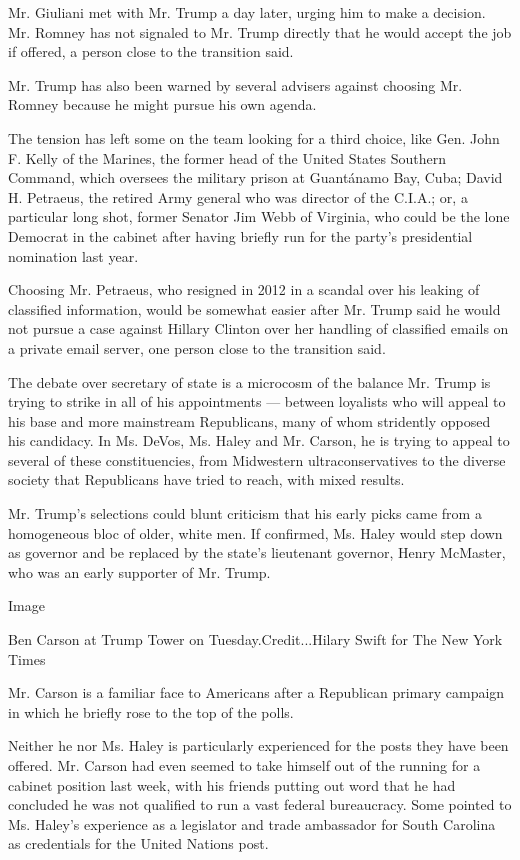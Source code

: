 Mr. Giuliani met with Mr. Trump a day later, urging him to make a
decision. Mr. Romney has not signaled to Mr. Trump directly that he
would accept the job if offered, a person close to the transition said.

Mr. Trump has also been warned by several advisers against choosing Mr.
Romney because he might pursue his own agenda.

The tension has left some on the team looking for a third choice, like
Gen. John F. Kelly of the Marines, the former head of the United States
Southern Command, which oversees the military prison at Guantánamo Bay,
Cuba; David H. Petraeus, the retired Army general who was director of
the C.I.A.; or, a particular long shot, former Senator Jim Webb of
Virginia, who could be the lone Democrat in the cabinet after having
briefly run for the party's presidential nomination last year.

Choosing Mr. Petraeus, who resigned in 2012 in a scandal over his
leaking of classified information, would be somewhat easier after Mr.
Trump said he would not pursue a case against Hillary Clinton over her
handling of classified emails on a private email server, one person
close to the transition said.

The debate over secretary of state is a microcosm of the balance Mr.
Trump is trying to strike in all of his appointments --- between
loyalists who will appeal to his base and more mainstream Republicans,
many of whom stridently opposed his candidacy. In Ms. DeVos, Ms. Haley
and Mr. Carson, he is trying to appeal to several of these
constituencies, from Midwestern ultraconservatives to the diverse
society that Republicans have tried to reach, with mixed results.

Mr. Trump's selections could blunt criticism that his early picks came
from a homogeneous bloc of older, white men. If confirmed, Ms. Haley
would step down as governor and be replaced by the state's lieutenant
governor, Henry McMaster, who was an early supporter of Mr. Trump.

Image

Ben Carson at Trump Tower on Tuesday.Credit...Hilary Swift for The New
York Times

Mr. Carson is a familiar face to Americans after a Republican primary
campaign in which he briefly rose to the top of the polls.

Neither he nor Ms. Haley is particularly experienced for the posts they
have been offered. Mr. Carson had even seemed to take himself out of the
running for a cabinet position last week, with his friends putting out
word that he had concluded he was not qualified to run a vast federal
bureaucracy. Some pointed to Ms. Haley's experience as a legislator and
trade ambassador for South Carolina as credentials for the United
Nations post.

